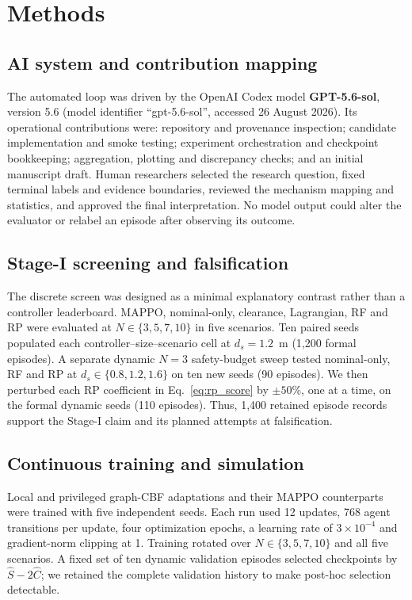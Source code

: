 \documentclass{article}
\begin{document}
\section{Methods}

\subsection{AI system and contribution mapping}
The automated loop was driven by the OpenAI Codex model \textbf{GPT-5.6-sol}, version 5.6 (model identifier ``gpt-5.6-sol'', accessed 26 August 2026). Its operational contributions were: repository and provenance inspection; candidate implementation and smoke testing; experiment orchestration and checkpoint bookkeeping; aggregation, plotting and discrepancy checks; and an initial manuscript draft. Human researchers selected the research question, fixed terminal labels and evidence boundaries, reviewed the mechanism mapping and statistics, and approved the final interpretation. No model output could alter the evaluator or relabel an episode after observing its outcome.

\subsection{Stage-I screening and falsification}
The discrete screen was designed as a minimal explanatory contrast rather than a controller leaderboard. MAPPO, nominal-only, clearance, Lagrangian, RF and RP were evaluated at $N\in\{3,5,7,10\}$ in five scenarios. Ten paired seeds populated each controller--size--scenario cell at $d_s=1.2$~m (1,200 formal episodes). A separate dynamic $N=3$ safety-budget sweep tested nominal-only, RF and RP at $d_s\in\{0.8,1.2,1.6\}$ on ten new seeds (90 episodes). We then perturbed each RP coefficient in Eq.~\ref{eq:rp_score} by $\pm50\%$, one at a time, on the formal dynamic seeds (110 episodes). Thus, 1,400 retained episode records support the Stage-I claim and its planned attempts at falsification.

\subsection{Continuous training and simulation}
Local and privileged graph-CBF adaptations and their MAPPO counterparts were trained with five independent seeds. Each run used 12 updates, 768 agent transitions per update, four optimization epochs, a learning rate of $3\times10^{-4}$ and gradient-norm clipping at 1. Training rotated over $N\in\{3,5,7,10\}$ and all five scenarios. A fixed set of ten dynamic validation episodes selected checkpoints by $\hat S-2\hat C$; we retained the complete validation history to make post-hoc selection detectable.
\end{document}
